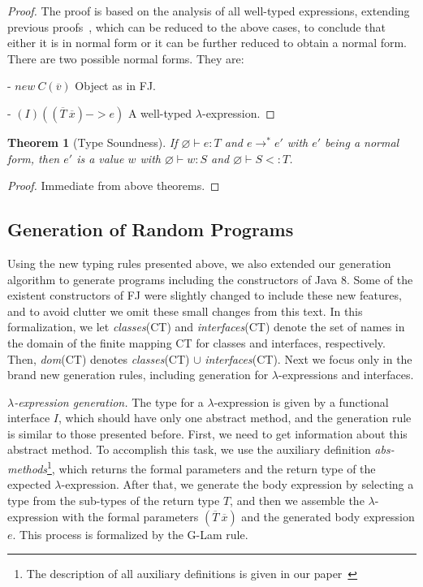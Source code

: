 \documentclass[tese,capa,english]{texufpel}
\newtheorem{theorem}{Theorem}
\begin{document}
\begin{proof}
The proof is based on the analysis of all well-typed expressions, extending previous proofs~\cite{Igarashi:2001:FJM:503502.503505}, which can be reduced to the above cases, to conclude that either it is in normal form or it can be further reduced to obtain a normal form. There are two possible normal forms. They are:
	
- $new ~ C(\overline{v})$ \hspace{46pt} Object as in FJ.
	
- $(I)((\overline{T} ~ \overline{x}) -> e)$ \hspace{20pt} A well-typed $\lambda$-expression.
\end{proof}

\begin{theorem}[Type Soundness]
	If $\varnothing \vdash e : T$  and $e \rightarrow^{*} e'$ with $e'$ being a normal form, then $e'$ is a value $w$ with $\varnothing \vdash w : S$ and $\varnothing \vdash S <: T$.
\end{theorem}

\begin{proof}
	Immediate from above theorems.
\end{proof}

\pagebreak

\subsection{Generation of Random Programs}

Using the new typing rules presented above, we also extended our generation algorithm to generate programs including the constructors of Java 8. Some of the existent constructors of FJ were slightly changed to include these new features, and to avoid clutter we omit these small changes from this text. In this formalization, we let \emph{classes}(CT) and \emph{interfaces}(CT) denote the set of names in the domain of the finite mapping CT for classes and interfaces, respectively. Then, \emph{dom}(CT) denotes \emph{classes}(CT) $\cup$ \emph{interfaces}(CT). Next we focus only in the brand new generation rules, including generation for $\lambda$-expressions and interfaces.

\vspace{8pt}

\noindent\emph{$\lambda$-expression generation.} The type for a $\lambda$-expression is given by a functional interface $I$, which should have only one abstract method, and the generation rule is similar to those presented before. First, we need to get information about this abstract method. To accomplish this task, we use the auxiliary definition \emph{abs-methods}\footnote{The description of all auxiliary definitions is given in our paper~\cite{feitosa2018-3}}, which returns the formal parameters and the return type of the expected $\lambda$-expression. After that, we generate the body expression by selecting a type from the sub-types of the return type $T$, and then we assemble the $\lambda$-expression with the formal parameters $(\overline{T} ~ \overline{x})$ and the generated body expression $e$. This process is formalized by the {\footnotesize G-Lam} rule.
\end{document}
